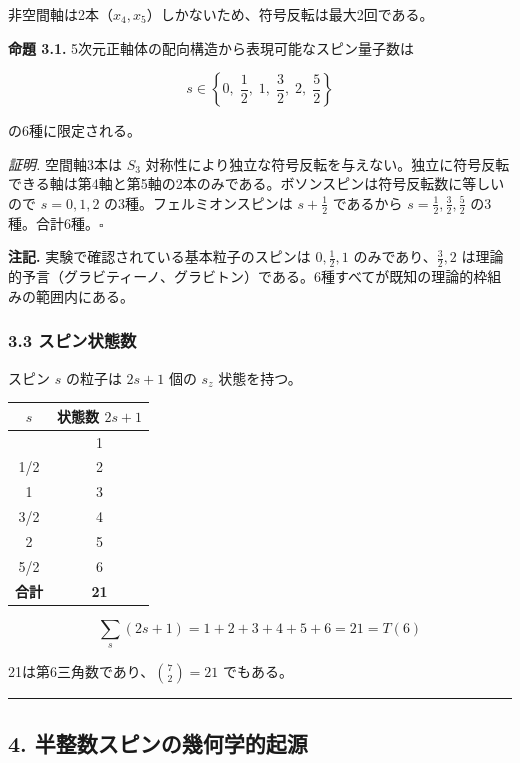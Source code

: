 \documentclass[a4paper,11pt]{ltjsarticle}
\newcounter{none}
\begin{document}
非空間軸は2本（$x_4, x_5$）しかないため、符号反転は最大2回である。

\textbf{命題 3.1.} 5次元正軸体の配向構造から表現可能なスピン量子数は

\[s \in \left\{ 0, \; \frac{1}{2}, \; 1, \; \frac{3}{2}, \; 2, \; \frac{5}{2} \right\}\]

の6種に限定される。

\emph{証明.} 空間軸3本は $S_3$
対称性により独立な符号反転を与えない。独立に符号反転できる軸は第4軸と第5軸の2本のみである。ボソンスピンは符号反転数に等しいので
$s = 0, 1, 2$ の3種。フェルミオンスピンは $s + \frac{1}{2}$
であるから $s = \frac{1}{2}, \frac{3}{2}, \frac{5}{2}$
の3種。合計6種。$\square$

\textbf{注記.} 実験で確認されている基本粒子のスピンは
$0, \frac{1}{2}, 1$ のみであり、$\frac{3}{2}, 2$
は理論的予言（グラビティーノ、グラビトン）である。6種すべてが既知の理論的枠組みの範囲内にある。

\subsubsection*{3.3 スピン状態数}

スピン $s$ の粒子は $2s + 1$ 個の $s_z$ 状態を持つ。

{\def\LTcaptype{none}
\begin{longtable}[]{@{}cc@{}}
\toprule
$s$ & 状態数 $2s+1$ \\
\midrule
\endhead
\bottomrule
\endlastfoot
0 & 1 \\
1/2 & 2 \\
1 & 3 \\
3/2 & 4 \\
2 & 5 \\
5/2 & 6 \\
\textbf{合計} & \textbf{21} \\
\end{longtable}
}

\[\sum_{s} (2s+1) = 1 + 2 + 3 + 4 + 5 + 6 = 21 = T(6)\]

21は第6三角数であり、$\binom{7}{2} = 21$ でもある。

\begin{center}\rule{0.5\linewidth}{0.5pt}\end{center}

\subsection*{4. 半整数スピンの幾何学的起源}
\end{document}
